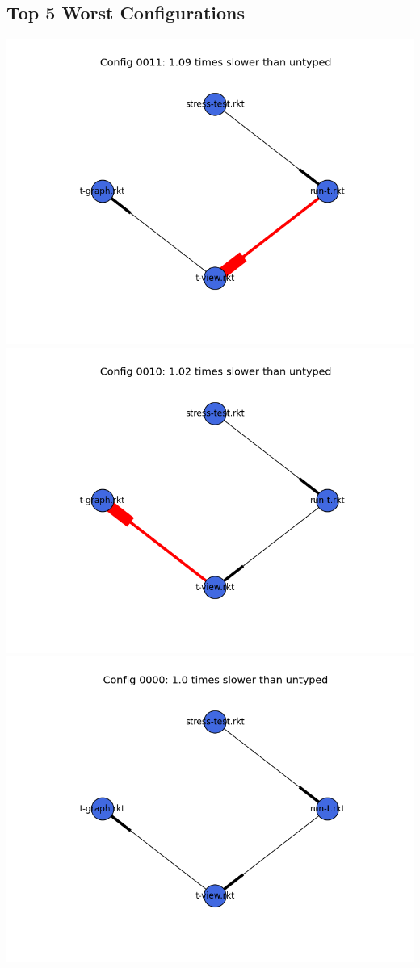 \documentclass{article}
\begin{document}
\begin{itemize}
\subsection{Top 5 Worst Configurations}
\includegraphics[width=\textwidth]{mbta-base-module-graph-0011.png}
\includegraphics[width=\textwidth]{mbta-base-module-graph-0010.png}
\includegraphics[width=\textwidth]{mbta-base-module-graph-0000.png}

\end{itemize}
\end{document}
